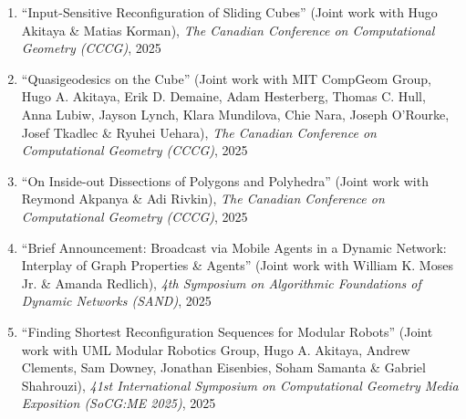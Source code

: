 \documentclass[letterpaper,11pt]{article}
\makeatletter
\newcommand{\publication}[6]{
  \item ``#1'' %
   (Joint work with#2), %
     \emph{#3}, %
      #4%


}
\newcommand{\pdficon}{\faFilePdf}
\newcommand{\codeicon}{\faCode}
\newcommand{\doilabel}{\texttt{DOI}}
\makeatother
\begin{document}
    \begin{enumerate}
    \setcounter{enumi}{\value{pubnum}}
      
        \publication
          {Input-Sensitive Reconfiguration of Sliding Cubes}
          {
 Hugo Akitaya \& Matias Korman}
          {The Canadian Conference on Computational Geometry (CCCG)}
          {2025}
          {%
\href{tba/docstore/Input-Sensitive-Sliding-Cubes-CCCG.pdf}{\pdficon}%
%
%
          }
          {1}
 \vspace{-.5em}  
      
        \publication
          {Quasigeodesics on the Cube}
          {
 MIT CompGeom Group, Hugo A. Akitaya, Erik D. Demaine, Adam Hesterberg, Thomas C. Hull, Anna Lubiw, Jayson Lynch, Klara Mundilova, Chie Nara, Joseph O'Rourke, Josef Tkadlec \& Ryuhei Uehara}
          {The Canadian Conference on Computational Geometry (CCCG)}
          {2025}
          {%
\href{tba/docstore/quasigeodesics-cube-cccg.pdf}{\pdficon}%
%
%
          }
          {2}
 \vspace{-.5em}  
      
        \publication
          {On Inside-out Dissections of Polygons and Polyhedra}
          {
 Reymond Akpanya \& Adi Rivkin}
          {The Canadian Conference on Computational Geometry (CCCG)}
          {2025}
          {%
\href{tba/docstore/inside-out-dissections-cccg.pdf}{\pdficon}%
%
\quad\href{https://doi.org/10.48550/arXiv.2411.06584}{\doilabel}%
          }
          {3}
 \vspace{-.5em}  
      
        \publication
          {Brief Announcement: Broadcast via Mobile Agents in a Dynamic Network: Interplay of Graph Properties \& Agents}
          {
 William K. Moses Jr. \& Amanda Redlich}
          {4th Symposium on Algorithmic Foundations of Dynamic Networks (SAND)}
          {2025}
          {%
\href{tba/docstore/Broadcast_via_Mobile_Agents_in_a_Dynamic_Network-sand.pdf}{\pdficon}%
%
\quad\href{https://doi.org/10.4230/LIPIcs.SAND.2025.17}{\doilabel}%
          }
          {4}
 \vspace{-.5em}  
      
        \publication
          {Finding Shortest Reconfiguration Sequences for Modular Robots}
          {
 UML Modular Robotics Group, Hugo A. Akitaya, Andrew Clements, Sam Downey, Jonathan Eisenbies, Soham Samanta \& Gabriel Shahrouzi}
          {41st International Symposium on Computational Geometry Media Exposition (SoCG:ME 2025)}
          {2025}
          {%
\href{tba/docstore/Finding-Shortest-Reconfig-Sequences-SOCGME.pdf}{\pdficon}%
\quad\href{https://github.com/Modular-Robotics-Group/modular-robotics}{\codeicon}%
\quad\href{https://doi.org/10.4230/LIPIcs.SoCG.2025.85}{\doilabel}%
          }
          {5}
 \vspace{-.5em}  
      

\end{enumerate}
\end{document}
